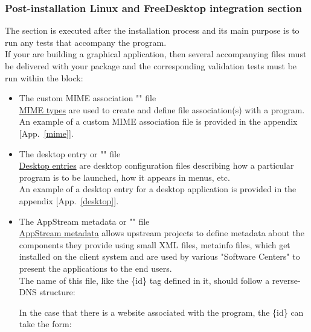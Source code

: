 \clearpage
\subsubsection{Post-installation Linux and FreeDesktop integration section}
\label{rpmpost}

The  section is executed after the installation process and its main purpose is to run any tests that accompany the program. \\
If your are building a graphical application, then several accompanying files must be delivered with your package and the corresponding validation tests must be run within the  block:
\begin{itemize}
\item The custom MIME association "" file \\[0.25cm]
\href{https://help.gnome.org/admin/system-admin-guide/stable/mime-types.html.en}{MIME types} are used to create and define file association(s) with a program. \\ 
An example of a custom MIME association file is provided in the appendix [App.~\ref{mime}].
\item The desktop entry or "" file \\[0.25cm]
\href{https://specifications.freedesktop.org/desktop-entry-spec/latest/}{Desktop entries} are desktop configuration files describing 
how a particular program is to be launched, how it appears in menus, etc. \\
An example of a desktop entry for a desktop application is provided in the appendix [App.~\ref{desktop}].
\item The AppStream metadata or "" file \\[0.25cm]
\href{https://www.freedesktop.org/software/appstream/docs/}{AppStream metadata} allows upstream projects to define metadata 
about the components they provide using small XML files, metainfo files, which get installed on the client system 
and are used by various "Software Centers" to present the applications to the end users. \\ 
The name of this file, like the \{id\} tag defined in it, should follow a reverse-DNS structure:
\vspace{-0.125cm}
\begin{center}\end{center}
\vspace{-0.25cm}
In the case that there is a website associated with the program, the \{id\} can take the form:

\end{itemize}

